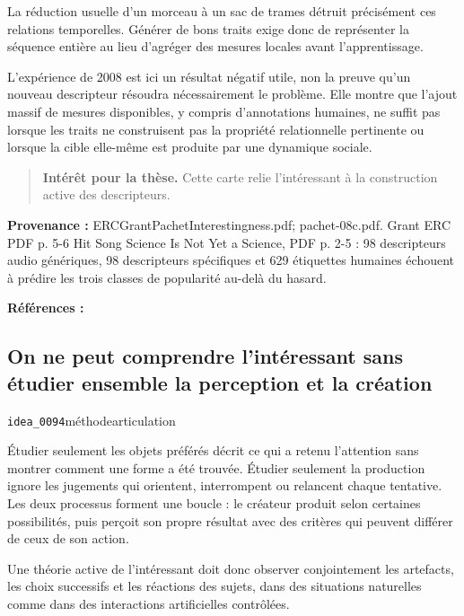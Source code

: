 \documentclass[10pt,a4paper]{article}
\begin{document}
La réduction usuelle d'un morceau à un sac de trames détruit précisément ces relations temporelles. Générer de bons traits exige donc de représenter la séquence entière au lieu d'agréger des mesures locales avant l'apprentissage.

L'expérience de 2008 est ici un résultat négatif utile, non la preuve qu'un nouveau descripteur résoudra nécessairement le problème. Elle montre que l'ajout massif de mesures disponibles, y compris d'annotations humaines, ne suffit pas lorsque les traits ne construisent pas la propriété relationnelle pertinente ou lorsque la cible elle-même est produite par une dynamique sociale.

\begin{quote}
\textbf{Intérêt pour la thèse.} Cette carte relie l'intéressant à la construction active des descripteurs.
\end{quote}
{\footnotesize\color{metadata}\textbf{Provenance :} ERCGrantPachetInterestingness.pdf; pachet-08c.pdf. Grant ERC PDF p. 5-6 Hit Song Science Is Not Yet a Science, PDF p. 2-5 : 98 descripteurs audio génériques, 98 descripteurs spécifiques et 629 étiquettes humaines échouent à prédire les trois classes de popularité au-delà du hasard.\par}
{\footnotesize\color{metadata}\textbf{Références :} \parencite{pachetroy2008hitsong}\par}

\subsection{On ne peut comprendre l'intéressant sans étudier ensemble la perception et la création}
{\small\color{metadata} \texttt{idea\_0094}\quad\textbullet\quad méthode\quad\textbullet\quad articulation\par}

Étudier seulement les objets préférés décrit ce qui a retenu l'attention sans montrer comment une forme a été trouvée. Étudier seulement la production ignore les jugements qui orientent, interrompent ou relancent chaque tentative. Les deux processus forment une boucle : le créateur produit selon certaines possibilités, puis perçoit son propre résultat avec des critères qui peuvent différer de ceux de son action.

Une théorie active de l'intéressant doit donc observer conjointement les artefacts, les choix successifs et les réactions des sujets, dans des situations naturelles comme dans des interactions artificielles contrôlées.
\end{document}
